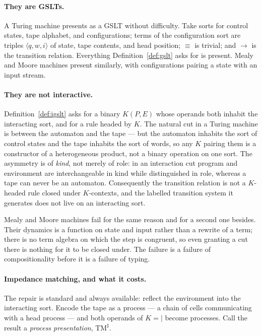 \documentclass[11pt,a4paper]{article}
\theoremstyle{definition}
\theoremstyle{plain}
\theoremstyle{remark}
\begin{document}
\paragraph{They are GSLTs.}
A Turing machine presents as a GSLT without difficulty. Take sorts for control
states, tape alphabet, and configurations; terms of the configuration sort are
triples $\langle q, w, i\rangle$ of state, tape contents, and head position;
$\equiv$ is trivial; and $\to$ is the transition relation. Everything
Definition~\ref{def:gslt} asks for is present. Mealy and Moore machines present
similarly, with configurations pairing a state with an input stream.

\paragraph{They are not interactive.}
Definition~\ref{def:igslt} asks for a binary $K(P,E)$ whose operands both inhabit the
interacting sort, and for a rule headed by $K$. The natural cut in a Turing machine
is between the automaton and the tape --- but the automaton inhabits the sort of
control states and the tape inhabits the sort of words, so any $K$ pairing them is a
constructor of a heterogeneous product, not a binary operation on one sort. The
asymmetry is of \emph{kind}, not merely of role: in an interaction cut program and
environment are interchangeable in kind while distinguished in role, whereas a tape
can never be an automaton. Consequently the transition relation is not a $K$-headed
rule closed under $K$-contexts, and the labelled transition system it generates does
not live on an interacting sort.

Mealy and Moore machines fail for the same reason and for a second one besides.
Their dynamics is a function on state and input rather than a rewrite of a term;
there is no term algebra on which the step is congruent, so even granting a cut there
is nothing for it to be closed under. The failure is a failure of compositionality
before it is a failure of typing.

\paragraph{Impedance matching, and what it costs.}
The repair is standard and always available: reflect the environment into the
interacting sort. Encode the tape as a process --- a chain of cells communicating with
a head process --- and both operands of $K = {\mid}$ become processes. Call the
result a \emph{process presentation}, $\mathrm{TM}^\sharp$.
\end{document}
